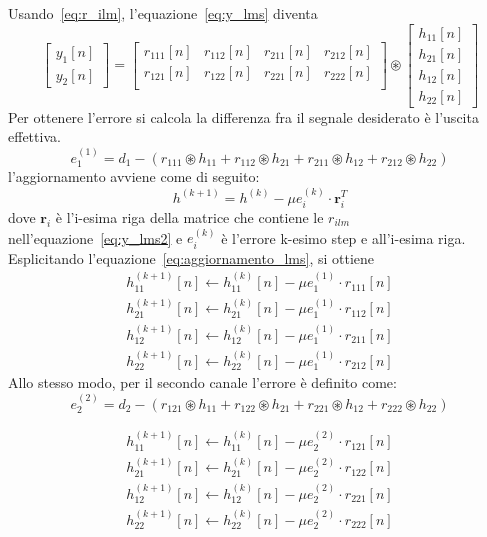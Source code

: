 \documentclass[12pt,a4paper,titlepage]{article}
\begin{document}
Usando~\eqref{eq:r_ilm}, l'equazione~\eqref{eq:y_lms} diventa
\begin{equation}\label{eq:y_lms2}
\begin{bmatrix}
	y_1[n]     \\
	y_2[n]    
\end{bmatrix}
= 
\begin{bmatrix}
	r_{111}[n]  &	r_{112}[n]  &  r_{211}[n]  &	r_{212}[n]    \\
	r_{121}[n]  &	r_{122}[n]  &  r_{221}[n]  &	r_{222}[n]    \\
\end{bmatrix} 
\circledast
\begin{bmatrix}
	h_{11}[n] \\
	h_{21}[n] \\
	h_{12}[n] \\
	h_{22}[n]  
\end{bmatrix} 
\end{equation}
Per ottenere l'errore si calcola la differenza fra il segnale desiderato è l'uscita effettiva.
\[
e_1^{(1)} = d_1 - (r_{111} \circledast h_{11} + r_{112} \circledast h_{21} + r_{211} \circledast h_{12} + r_{212} \circledast h_{22})
\]
l'aggiornamento avviene come di seguito:
\begin{equation}\label{eq:aggiornamento_lms}
h^{(k+1)} = h^{(k)} - \mu e_i^{(k)} \cdot \mathbf{r}_i^T
\end{equation}
dove $\mathbf{r}_i$ è l'i-esima riga della matrice che contiene le $r_{ilm}$ nell'equazione~\eqref{eq:y_lms2} e $e_i^{(k)}$ è l'errore k-esimo step e all'i-esima riga. Esplicitando l'equazione~\eqref{eq:aggiornamento_lms}, si ottiene
\[
\begin{split}
h_{11}^{(k+1)}[n] \leftarrow h_{11}^{(k)}[n] - \mu e_1^{(1)} \cdot r_{111}[n]\\
h_{21}^{(k+1)}[n] \leftarrow h_{21}^{(k)}[n] - \mu e_1^{(1)} \cdot r_{112}[n]\\
h_{12}^{(k+1)}[n] \leftarrow h_{12}^{(k)}[n] - \mu e_1^{(1)} \cdot r_{211}[n]\\
h_{22}^{(k+1)}[n] \leftarrow h_{22}^{(k)}[n] - \mu e_1^{(1)} \cdot r_{212}[n]
\end{split}
\]
Allo stesso modo, per il secondo canale l'errore è definito come:
\[e_2^{(2)} = d_2- (r_{121} \circledast h_{11} + r_{122} \circledast h_{21} + r_{221} \circledast h_{12} + r_{222} \circledast h_{22})
\]

\[
\begin{split}
h_{11}^{(k+1)}[n] \leftarrow h_{11}^{(k)}[n] - \mu e_2^{(2)} \cdot r_{121}[n]\\
h_{21}^{(k+1)}[n] \leftarrow h_{21}^{(k)}[n] - \mu e_2^{(2)} \cdot r_{122}[n]\\
h_{12}^{(k+1)}[n] \leftarrow h_{12}^{(k)}[n] - \mu e_2^{(2)} \cdot r_{221}[n]\\
h_{22}^{(k+1)}[n] \leftarrow h_{22}^{(k)}[n] - \mu e_2^{(2)} \cdot r_{222}[n]\\
\end{split}
\]
\end{document}
